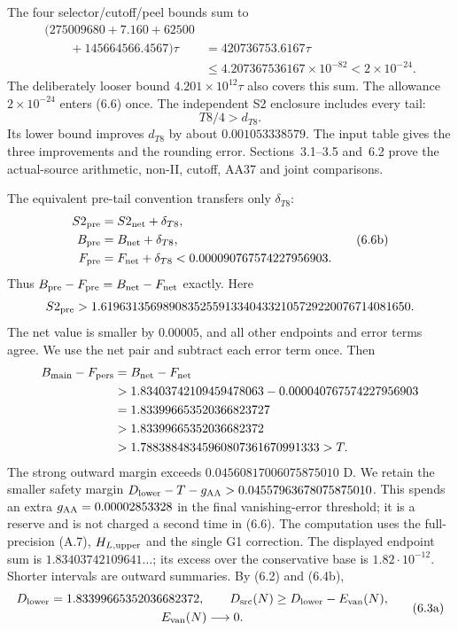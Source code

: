 The four selector/cutoff/peel bounds sum to
\[
\begin{split}
\bigl(275009680+7.160+62500\\
\qquad+145664566.4567\bigr)\tau
&=420736753.6167\tau\\
&\le4.207367536167\times10^{-82}<2\times10^{-24}.
\end{split}
\]
The deliberately looser bound $4.201\times10^{12}\tau$ also covers this sum.
The allowance $2\times10^{-24}$ enters (6.6) once.
The independent S2 enclosure includes every tail:
\[
T8/4>d_{T8}.\tag{6.6a}
\]
Its lower bound improves $d_{T8}$ by about $0.001053338579$.
The input table gives the three improvements and the rounding error.
Sections~3.1--3.5 and~6.2 prove the actual-source arithmetic,
non-II, cutoff, AA37 and joint comparisons.

The equivalent pre-tail convention transfers only $\delta_{T8}$:
\[
\begin{aligned}
S2_{\rm pre}&=S2_{\rm net}+\delta_{T8},\\
B_{\rm pre}&=B_{\rm net}+\delta_{T8},\\
F_{\rm pre}&=F_{\rm net}+\delta_{T8}<0.000090767574227956903.
\end{aligned}\tag{6.6b}
\]
Thus $B_{\rm pre}-F_{\rm pre}=B_{\rm net}-F_{\rm net}$ exactly.
Here
\[
S2_{\rm pre}>1.61963135698908352559133404332105729220076714081650.
\]
The net value is smaller by $0.00005$,
and all other endpoints and error terms agree.
We use the net pair and subtract each error term once.
Then
\[
\begin{aligned}
B_{\rm main}-F_{\rm pers}&=B_{\rm net}-F_{\rm net}\\
&>1.83403742109459478063-0.000040767574227956903\\
&=1.833996653520366823727\\
&>1.83399665352036682372\\
&>1.78838848345960807361670991333>T.
\end{aligned}
\]
The strong outward margin exceeds $0.04560817006075875010$ D.
We retain the smaller safety margin
$D_{\rm lower}-T-g_{\rm AA}>0.04557963678075875010$.
This spends an extra $g_{\rm AA}=0.00002853328$ in the final vanishing-error
threshold; it is a reserve and is not charged a second time in (6.6).
The computation uses the full-precision (A.7), $H_{L,\rm upper}$ and the single G1 correction.
The displayed endpoint sum is $1.83403742109641\ldots$;
its excess over the conservative base is $1.82\cdot10^{-12}$.
Shorter intervals are outward summaries.
By (6.2) and (6.4b),
\[
\begin{gathered}
D_{\rm lower}=1.83399665352036682372,\qquad
D_{\rm src}(N)\ge D_{\rm lower}-E_{\rm van}(N),\\
E_{\rm van}(N)\longrightarrow0.
\end{gathered}\tag{6.3a}
\]

